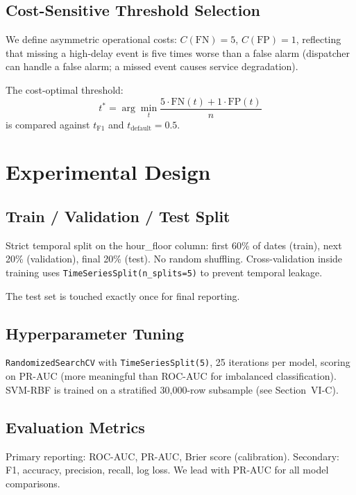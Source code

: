 \documentclass[conference]{IEEEtran}
\begin{document}
\subsection{Cost-Sensitive Threshold Selection}

We define asymmetric operational costs: $C(\text{FN}) = 5$, $C(\text{FP}) = 1$,
reflecting that missing a high-delay event is five times worse than a false alarm
(dispatcher can handle a false alarm; a missed event causes service degradation).

The cost-optimal threshold:
\begin{equation}
t^* = \arg\min_t \frac{5 \cdot \text{FN}(t) + 1 \cdot \text{FP}(t)}{n}
\end{equation}
is compared against $t_{\text{F1}}$ and $t_{\text{default}}=0.5$.

\section{Experimental Design}

\subsection{Train / Validation / Test Split}

Strict temporal split on the hour\_floor column: first 60\% of dates (train),
next 20\% (validation), final 20\% (test). No random shuffling. Cross-validation
inside training uses \texttt{TimeSeriesSplit(n\_splits=5)} to prevent temporal leakage.

The test set is touched exactly once for final reporting.

\subsection{Hyperparameter Tuning}

\texttt{RandomizedSearchCV} with \texttt{TimeSeriesSplit(5)}, 25 iterations per model,
scoring on PR-AUC (more meaningful than ROC-AUC for imbalanced classification).
SVM-RBF is trained on a stratified 30,000-row subsample (see Section~VI-C).

\subsection{Evaluation Metrics}

Primary reporting: ROC-AUC, PR-AUC, Brier score (calibration). Secondary: F1, accuracy,
precision, recall, log loss. We lead with PR-AUC for all model comparisons.
\end{document}
